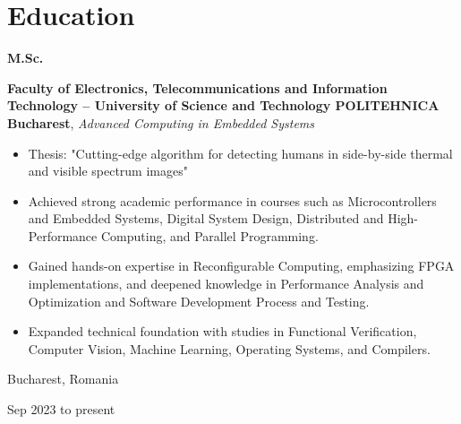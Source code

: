 \documentclass[10pt, a4paper]{article}
\newenvironment{highlights}{
    \begin{itemize}[
        topsep=0.1 cm,
        parsep=0.1 cm,
        partopsep=0pt,
        itemsep=0pt,
        leftmargin=0 cm + 10pt
    ]
}{
    \end{itemize}
} %
\newenvironment{threecolentry}[3][]{
    \onecolentry
    \def\thirdColumn{#3}
    \setcolumnwidth{1 cm, \fill, 3.5 cm}
    \begin{paracol}{3}
    {\raggedright #2} \switchcolumn
}{
    \switchcolumn \raggedleft \thirdColumn
    \end{paracol}
    \endonecolentry
} %
\begin{document}
    
    \section{Education}



        
        \begin{threecolentry}{\textbf{M.Sc.}}{
            Bucharest, Romania

        Sep 2023 to present
        }
            \textbf{Faculty of Electronics, Telecommunications and Information Technology – University of Science and Technology POLITEHNICA Bucharest}, \textit{Advanced Computing in Embedded Systems}
            \begin{highlights}
                \item Thesis: "Cutting-edge algorithm for detecting humans in side-by-side thermal and visible spectrum images"
                \item Achieved strong academic performance in courses such as Microcontrollers and Embedded Systems, Digital System Design, Distributed and High-Performance Computing, and Parallel Programming.
                \item Gained hands-on expertise in Reconfigurable Computing, emphasizing FPGA implementations, and deepened knowledge in Performance Analysis and Optimization and Software Development Process and Testing.
                \item Expanded technical foundation with studies in Functional Verification, Computer Vision, Machine Learning, Operating Systems, and Compilers.
            \end{highlights}
        \end{threecolentry}

        \vspace{0.2 cm}
\end{document}
